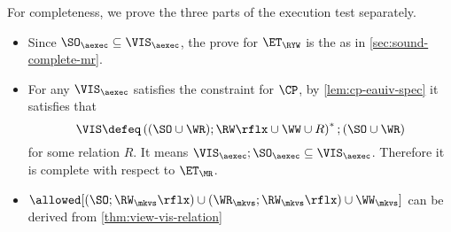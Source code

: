 For completeness, we prove the three parts of the execution test separately.
\begin{itemize}
\item Since \( \SO_\aexec \subseteq \VIS_\aexec  \), the prove for \( \ET_\RYW \) is the as in \cref{sec:sound-complete-mr}.
\item For any \( \VIS_\aexec \)  satisfies the constraint for \( \CP \), by \cref{lem:cp-eauiv-spec} it satisfies that 
\[
    \VIS \defeq \left( (\SO \cup \WR ) ; \RW\rflx \cup \WW \cup R \right)^* ; (\SO \cup \WR )
\]
for some relation \( R \).
It means \( \VIS_\aexec ; \SO_\aexec \subseteq \VIS_\aexec \).
Therefore it is complete with respect to \( \ET_\MR \).

\item \( \allowed[(\SO ; \RW_{\mkvs}\rflx) \cup (\WR_{\mkvs} ; \RW_{\mkvs}\rflx) \cup \WW_\mkvs] \) can be derived from \cref{thm:view-vis-relation}
\end{itemize}
